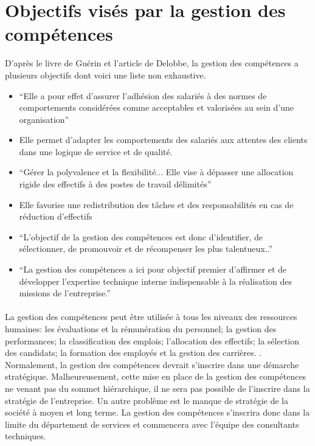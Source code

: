 \section{Objectifs visés par la gestion des compétences}
D'après le livre de Guérin\citep{gestionressourceshumaine2007} et l'article de Delobbe\citep{delobbe}, la gestion des compétences a plusieurs objectifs dont voici une liste non exhaustive.
\begin{itemize}
    \item \enquote{Elle a pour effet d'assurer l'adhésion des salariés à des normes de comportements considérées comme acceptables et valorisées au sein d'une organisation}\citep[p.40]{delobbe}
    \item Elle permet d'adapter les comportements des salariés aux attentes des clients dans une logique de service et de qualité. \citep[182]{gestionressourceshumaine2007}
    \item \enquote{Gérer la polyvalence et la flexibilité... Elle vise à dépasser une allocation rigide des effectifs à des postes de travail délimités}\citep[p.41]{delobbe}
    \item Elle favorise une redistribution des tâches et des responsabilités en cas de réduction d'effectifs \citep[182]{gestionressourceshumaine2007}
    \item  \enquote{L'objectif de la gestion des compétences est donc d'identifier, de sélectionner, de promouvoir et de récompenser les plus talentueux..}\citep[p.43]{delobbe}
    \item  \enquote{La gestion des compétences a ici pour objectif premier d'affirmer et de développer l'expertise technique interne indispensable à la réalisation des missions de l'entreprise.} \citep[p.45]{delobbe}

\end{itemize}

\paragraph{}La gestion des compétences peut être utilisée à tous les niveaux des ressources humaines: les évaluations et la rémunération du personnel; la gestion des performances; la classification des emplois; l'allocation des effectifs; la sélection des candidats; la formation des employés et la gestion des carrières. \citep[p.32]{delobbe}. Normalement, la gestion des compétences devrait s'inscrire dans une démarche stratégique. Malheureusement, cette mise en place de la gestion des compétences ne venant pas du sommet hiérarchique, il ne sera pas possible de l'inscrire dans la stratégie de l'entreprise. Un autre problème est le manque de stratégie de la société à moyen et long terme.  La gestion des compétences s'inscrira donc dans la limite du département de services et commencera avec l'équipe des consultants techniques. 

